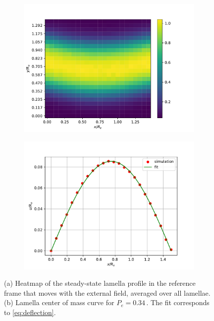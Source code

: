 \documentclass[bachelor,       %
               twoside,        %
               BCOR10mm,       %
               ngerman, english %
               ]{GAUBM}
\begin{document}
\begin{figure}[h]
  \centering
  \begin{subfigure}[b]{0.45\textwidth}
      \centering
      \includegraphics[width=\textwidth]{figures/heatmap_t2000.pdf}
      \caption{}
      \label{fig:lamella_heatmap}
  \end{subfigure}
    \hfill
  \begin{subfigure}[b]{0.45\textwidth}
      \centering
      \includegraphics[width=\textwidth]{figures/lamella_profile_t2000.pdf}
      \caption{}
      \label{fig:lamella_deflection}
  \end{subfigure}
     \caption{(a) Heatmap of the steady-state lamella profile in the reference frame that moves with the external field, averaged over all lamellae. (b) Lamella center of mass curve for $P_e=0.34\,$. The fit corresponds to \eqref{eq:deflection}.}
     \label{fig:lamella_bent}
\end{figure}
\end{document}
